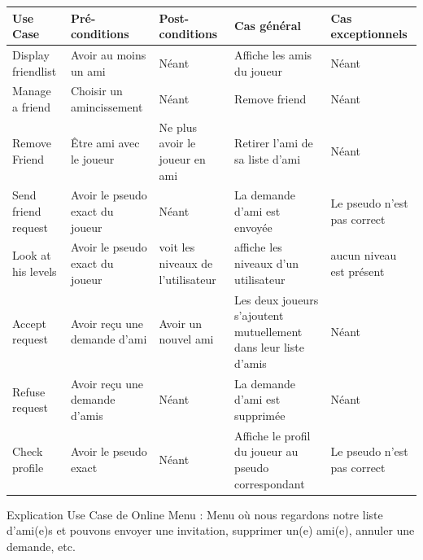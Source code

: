 \documentclass[french]{article}
\begin{document}
\newpage
\begin{longtable}{|p{}|p{}|p{}|p{}|p{}|}
  \toprule
  \rowcolor{lightgray}
  \textbf{Use Case} & \textbf{Pré-conditions} & \textbf{Post-conditions}& \textbf{Cas général} & \textbf{Cas exceptionnels}\\
  \midrule
  Display friendlist & Avoir au moins un ami & Néant & Affiche les amis du joueur & Néant\\
  \hline
  Manage a friend & Choisir un amincissement & Néant & Remove friend &  Néant\\
  \hline
  Remove Friend & Être ami avec le joueur & Ne plus avoir le joueur en ami & Retirer l'ami de sa liste d'ami & Néant\\
  \hline
  Send friend request & Avoir le pseudo exact du joueur & Néant & La demande d'ami est envoyée & Le pseudo n'est pas correct\\
  \hline
  Look at his levels &  Avoir le pseudo exact du joueur & voit les niveaux de l'utilisateur & affiche les niveaux d'un utilisateur & aucun niveau est présent\\
  \hline
  Accept request & Avoir reçu une demande d'ami & Avoir un nouvel ami & Les deux joueurs s'ajoutent mutuellement dans leur liste d'amis & Néant\\
  \hline
  Refuse request & Avoir reçu une demande d'amis & Néant & La demande d'ami est supprimée & Néant\\
  \hline
  Check profile & Avoir le pseudo exact & Néant & Affiche le profil du joueur au pseudo correspondant & Le pseudo n'est pas correct\\
  \bottomrule
\end{longtable}
\begin{center}
Explication Use Case de Online Menu : Menu où nous regardons notre liste d'ami(e)s et pouvons envoyer une invitation, supprimer un(e) ami(e), annuler une demande, etc. 
\end{center}
\end{document}
